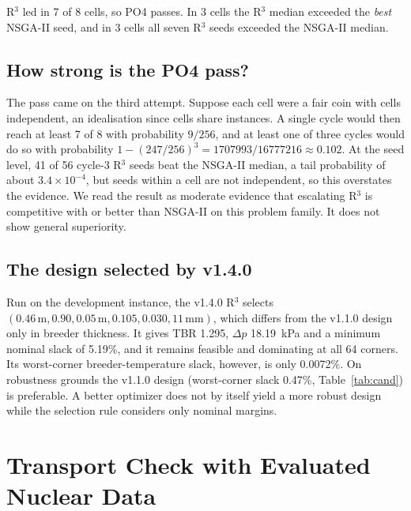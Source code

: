 \documentclass[11pt]{article}
\begin{document}
R$^3$ led in 7 of 8 cells, so PO4 passes. In 3 cells the R$^3$ median exceeded the \emph{best}
NSGA-II seed, and in 3 cells all seven R$^3$ seeds exceeded the NSGA-II median.

\subsection{How strong is the PO4 pass?}
\label{sec:mult}

The pass came on the third attempt. Suppose each cell were a fair coin with cells independent, an
idealisation since cells share instances. A single cycle would then reach at least 7 of 8 with
probability $9/256$, and at least one of three cycles would do so with probability
$1-(247/256)^3 = 1707993/16777216 \approx 0.102$. At the seed level, 41 of 56 cycle-3 R$^3$ seeds
beat the NSGA-II median, a tail probability of about $3.4\times10^{-4}$, but seeds within a cell are not
independent, so this overstates the evidence. We read the result as moderate evidence that
escalating R$^3$ is competitive with or better than NSGA-II on this problem family. It does not
show general superiority.

\subsection{The design selected by v1.4.0}

Run on the development instance, the v1.4.0 R$^3$ selects $(0.46\,\text{m}, 0.90, 0.05\,\text{m}, 0.105, 0.030, 11\,\text{mm})$,
which differs from the v1.1.0 design only in breeder thickness. It gives TBR 1.295, $\Delta p$ 18.19~kPa and a
minimum nominal slack of 5.19\%, and it remains feasible and dominating at all 64 corners. Its worst-corner
breeder-temperature slack, however, is only 0.0072\%. On robustness grounds the v1.1.0 design
(worst-corner slack 0.47\%, Table~\ref{tab:cand}) is preferable. A better optimizer does not by itself
yield a more robust design while the selection rule considers only nominal margins.

\section{Transport Check with Evaluated Nuclear Data}
\label{sec:transport}
\end{document}
